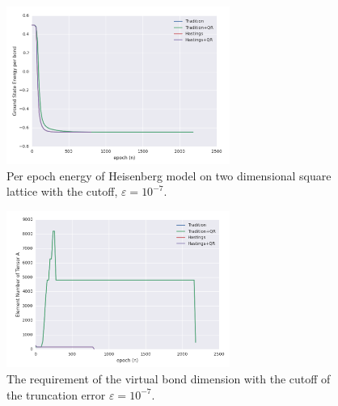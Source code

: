 \begin{figure}[ht]
	\centering
	\includegraphics[width=0.65\textwidth]{figures/fig326.png}
	\caption[Energy per epoch of Heisenberg model on two dimensional square lattice with the cutoff, $\varepsilon = 10^{-7}$]{Per epoch energy of Heisenberg model on two dimensional square lattice with the cutoff, $\varepsilon = 10^{-7}$.}
	\label{fig326}
\end{figure}

\begin{figure}[ht]
	\centering
	\includegraphics[width=0.65\textwidth]{figures/fig327.png}
	\caption[The requirement of the virtaul bond dimension with the cutoff of the truncation error $\varepsilon = 10^{-7}$]{The requirement of the virtual bond dimension with the cutoff of the truncation error $\varepsilon = 10^{-7}$.}
	\label{fig327}
\end{figure}
